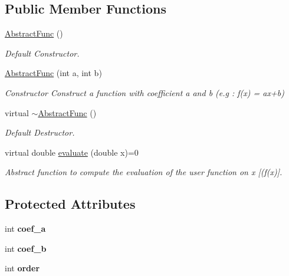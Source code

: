 \subsection*{Public Member Functions}
\begin{DoxyCompactItemize}
\item 
\mbox{\label{classAbstractFunc_a50a0d29bc7047f32e009a1bdaf481bc5}} 
\hyperlink{classAbstractFunc_a50a0d29bc7047f32e009a1bdaf481bc5}{Abstract\+Func} ()
\begin{DoxyCompactList}\small\item\em Default Constructor. \end{DoxyCompactList}\item 
\hyperlink{classAbstractFunc_a2f8a88c02beff30adb2eb54346e8bb0f}{Abstract\+Func} (int a, int b)
\begin{DoxyCompactList}\small\item\em Constructor Construct a function with coefficient a and b (e.\+g \+: f(x) = ax+b) \end{DoxyCompactList}\item 
\mbox{\label{classAbstractFunc_a9696320769335f8fea3e537b74032851}} 
virtual \hyperlink{classAbstractFunc_a9696320769335f8fea3e537b74032851}{$\sim$\+Abstract\+Func} ()
\begin{DoxyCompactList}\small\item\em Default Destructor. \end{DoxyCompactList}\item 
virtual double \hyperlink{classAbstractFunc_ac98be1daa5131b9fddcfdba0a2c34871}{evaluate} (double x)=0
\begin{DoxyCompactList}\small\item\em Abstract function to compute the evaluation of the user function on x \mbox{[}(f(x)\mbox{]}. \end{DoxyCompactList}\end{DoxyCompactItemize}
\subsection*{Protected Attributes}
\begin{DoxyCompactItemize}
\item 
\mbox{\label{classAbstractFunc_ae4a1f381c5bc27564218bdc77b2c722e}} 
int {\bfseries coef\+\_\+a}
\item 
\mbox{\label{classAbstractFunc_aefbfa8961c422c6f3c23adf0976061f2}} 
int {\bfseries coef\+\_\+b}
\item 
\mbox{\label{classAbstractFunc_afb8a73dd7c2c253de9fc88efc0ad99de}} 
int {\bfseries order}
\end{DoxyCompactItemize}


